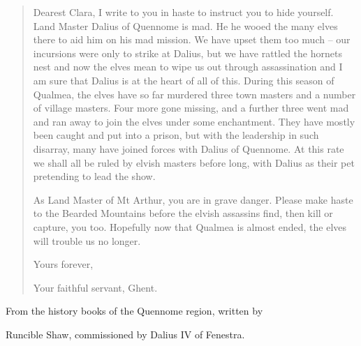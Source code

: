 \begin{quotation}

Dearest Clara, I write to you in haste to instruct you to hide yourself.  Land Master Dalius of Quennome is mad.  He he wooed the many elves there to aid him on his mad mission.  We have upset them too much -- our incursions were only to strike at Dalius, but we have rattled the hornets nest and now the elves mean to wipe us out through assassination and I am sure that Dalius is at the heart of all of this.  During this season of Qualmea, the elves have so far murdered three town masters and a number of village masters.  Four more gone missing, and a further three went mad and ran away to join the elves under some enchantment.  They have mostly been caught and put into a prison, but with the leadership in such disarray, many have joined forces with Dalius of Quennome.  At this rate we shall all be ruled by elvish masters before long, with Dalius as their pet pretending to lead the show.

	As Land Master of Mt Arthur, you are in grave danger.  Please make haste to the Bearded Mountains before the elvish assassins find, then kill or capture, you too.  Hopefully now that Qualmea is almost ended, the elves will trouble us no longer.

	Yours forever,

	Your faithful servant, Ghent.

\end{quotation}

From the history books of the Quennome region, written by

 Runcible Shaw, commissioned by Dalius IV of Fenestra.

